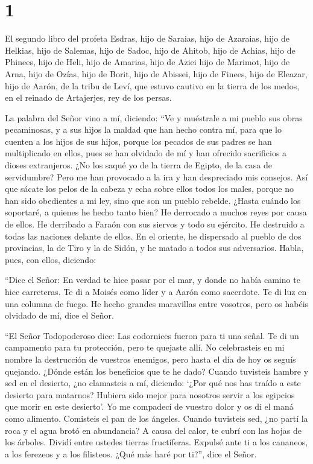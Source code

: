 \hypertarget{section}{%
\section{1}\label{section}}

 El segundo libro del profeta Esdras, hijo de Saraias,
hijo de Azaraias, hijo de Helkias, hijo de Salemas, hijo de Sadoc, hijo
de Ahitob,  hijo de Achias, hijo de Phinees, hijo de Heli,
hijo de Amarias, hijo de Aziei hijo de Marimot, hijo de Arna, hijo de
Ozías, hijo de Borit, hijo de Abissei, hijo de Finees, hijo de Eleazar,
 hijo de Aarón, de la tribu de Leví, que estuvo cautivo en
la tierra de los medos, en el reinado de Artajerjes, rey de los persas.

 La palabra del Señor vino a mí, diciendo: 
``Ve y muéstrale a mi pueblo sus obras pecaminosas, y a sus hijos la
maldad que han hecho contra mí, para que lo cuenten a los hijos de sus
hijos,  porque los pecados de sus padres se han
multiplicado en ellos, pues se han olvidado de mí y han ofrecido
sacrificios a dioses extranjeros.  ¿No los saqué yo de la
tierra de Egipto, de la casa de servidumbre? Pero me han provocado a la
ira y han despreciado mis consejos.  Así que sácate los
pelos de la cabeza y echa sobre ellos todos los males, porque no han
sido obedientes a mi ley, sino que son un pueblo rebelde. 
¿Hasta cuándo los soportaré, a quienes he hecho tanto bien?
 He derrocado a muchos reyes por causa de ellos. He
derribado a Faraón con sus siervos y todo su ejército. 
He destruido a todas las naciones delante de ellos. En el oriente, he
dispersado al pueblo de dos provincias, la de Tiro y la de Sidón, y he
matado a todos sus adversarios.  Habla, pues, con ellos,
diciendo:

 ``Dice el Señor: En verdad te hice pasar por el mar, y
donde no había camino te hice carreteras. Te di a Moisés como líder y a
Aarón como sacerdote.  Te di luz en una columna de fuego.
He hecho grandes maravillas entre vosotros, pero os habéis olvidado de
mí, dice el Señor.

 ``El Señor Todopoderoso dice: Las codornices fueron para
ti una señal. Te di un campamento para tu protección, pero te quejaste
allí.  No celebrasteis en mi nombre la destrucción de
vuestros enemigos, pero hasta el día de hoy os seguís quejando.
 ¿Dónde están los beneficios que te he dado? Cuando
tuvisteis hambre y sed en el desierto, ¿no clamasteis a mí,
 diciendo: `¿Por qué nos has traído a este desierto para
matarnos? Hubiera sido mejor para nosotros servir a los egipcios que
morir en este desierto'.  Yo me compadecí de vuestro
dolor y os di el maná como alimento. Comisteis el pan de los ángeles.
 Cuando tuvisteis sed, ¿no partí la roca y el agua brotó
en abundancia? A causa del calor, te cubrí con las hojas de los árboles.
 Dividí entre ustedes tierras fructíferas. Expulsé ante
ti a los cananeos, a los ferezeos y a los filisteos. ¿Qué más haré por
ti?'', dice el Señor.

